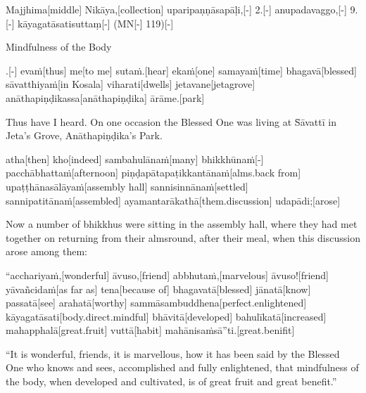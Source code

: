 
\begin{samepage}
\begingl[glneveryline={\PaliGlossA,\PaliGlossB}]
Majjhima[middle] Nikāya,[collection] uparipaṇṇāsapāḷi,[-] 2.[-] anupadavaggo,[-] 9.[-] kāyagatāsatisuttaṃ[-] (MN[-] 119)[-]
\endgl
\nopagebreak
\linespread{0.5}
\begin{spacin}{0.2}
{\PaliGlossFT Mindfulness of the Body}
\end{spacin}
\vskip 12pt
\end{samepage}
\vskip 0.05in
\begin{samepage}
.[-] evaṁ[thus] me[to me] sutaṁ.[hear] ekaṁ[one] samayaṁ[time] bhagavā[blessed] sāvatthiyaṁ[in Kosala] viharati[dwells] jetavane[jetagrove] anāthapiṇḍikassa[anāthapiṇḍika] ārāme.[park]
\endgl
\nopagebreak
\linespread{0.5}
\begin{spacin}{0.2}
{\PaliGlossFT Thus have I heard. On one occasion the Blessed One was living at S̄āvattī in Jeta’s Grove, Anāthapiṇḍika’s Park.}
\end{spacin}
\vskip 12pt
\end{samepage}
\begin{samepage}
\begingl[glneveryline={\PaliGlossA,\PaliGlossB}]
atha[then] kho[indeed] sambahulānaṁ[many] bhikkhūnaṁ[-] pacchābhattaṁ[afternoon] piṇḍapātapaṭikkantānaṁ[alms.back from] upaṭṭhānasālāyaṁ[assembly hall] sannisinnānaṁ[settled] sannipatitānaṁ[assembled] ayamantarākathā[them.discussion] udapādi;[arose]
\endgl
\nopagebreak
\linespread{0.5}
\begin{spacin}{0.2}
{\PaliGlossFT Now a number of bhikkhus were sitting in the assembly hall, where they had met together on returning from their almsround, after their meal, when this discussion arose among them:}
\end{spacin}
\vskip 12pt
\end{samepage}
\begin{samepage}
\begingl[glneveryline={\PaliGlossA,\PaliGlossB}]
“acchariyaṁ,[wonderful] āvuso,[friend] abbhutaṁ,[marvelous] āvuso![friend] yāvañcidaṁ[as far as] tena[because of] bhagavatā[blessed] jānatā[know] passatā[see] arahatā[worthy] sammāsambuddhena[perfect.enlightened] kāyagatāsati[body.direct.mindful] bhāvitā[developed] bahulīkatā[increased] mahapphalā[great.fruit] vuttā[habit] mahānisaṁsā”ti.[great.benifit]
\endgl
\nopagebreak
\linespread{0.5}
\begin{spacin}{0.2}
{\PaliGlossFT “It is wonderful, friends, it is marvellous, how it has been said by the Blessed One who knows and sees, accomplished and fully enlightened, that mindfulness of the body, when developed and cultivated, is of great fruit and great benefit.”}
\end{spacin}
\vskip 12pt
\end{samepage}
